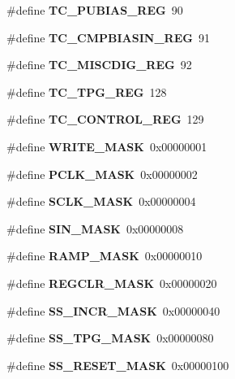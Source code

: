 \begin{DoxyCompactItemize}
\item 
\mbox{\label{_t_a_r_g_e_t_c___register_map_8h_a6f70b4595954ee34ef051f037d60ad72}} 
\#define {\bfseries T\+C\+\_\+\+P\+U\+B\+I\+A\+S\+\_\+\+R\+EG}~90
\item 
\mbox{\label{_t_a_r_g_e_t_c___register_map_8h_a981f56858ab0505bdfb5f44a8e383a08}} 
\#define {\bfseries T\+C\+\_\+\+C\+M\+P\+B\+I\+A\+S\+I\+N\+\_\+\+R\+EG}~91
\item 
\mbox{\label{_t_a_r_g_e_t_c___register_map_8h_af51134fc67d8fb0b51f0f740de167547}} 
\#define {\bfseries T\+C\+\_\+\+M\+I\+S\+C\+D\+I\+G\+\_\+\+R\+EG}~92
\item 
\mbox{\label{_t_a_r_g_e_t_c___register_map_8h_a0cbafe5115580fb4d1f0904c9922c984}} 
\#define {\bfseries T\+C\+\_\+\+T\+P\+G\+\_\+\+R\+EG}~128
\item 
\#define \textbf{ T\+C\+\_\+\+C\+O\+N\+T\+R\+O\+L\+\_\+\+R\+EG}~129
\item 
\mbox{\label{_t_a_r_g_e_t_c___register_map_8h_a63ac36b9e7738f8045152703b0d12610}} 
\#define {\bfseries W\+R\+I\+T\+E\+\_\+\+M\+A\+SK}~0x00000001
\item 
\mbox{\label{_t_a_r_g_e_t_c___register_map_8h_a481712bdbf0fd7feceff5f0f0f0270eb}} 
\#define {\bfseries P\+C\+L\+K\+\_\+\+M\+A\+SK}~0x00000002
\item 
\mbox{\label{_t_a_r_g_e_t_c___register_map_8h_ad5ce81d4dfee76c8602a216dec624697}} 
\#define {\bfseries S\+C\+L\+K\+\_\+\+M\+A\+SK}~0x00000004
\item 
\mbox{\label{_t_a_r_g_e_t_c___register_map_8h_a5f7ed5fc9832179ddb82998905555513}} 
\#define {\bfseries S\+I\+N\+\_\+\+M\+A\+SK}~0x00000008
\item 
\mbox{\label{_t_a_r_g_e_t_c___register_map_8h_aa03200be65ded4cc94da28c4ee5ff6de}} 
\#define {\bfseries R\+A\+M\+P\+\_\+\+M\+A\+SK}~0x00000010
\item 
\mbox{\label{_t_a_r_g_e_t_c___register_map_8h_a438c77f5783ee313533f65a4c152e4ca}} 
\#define {\bfseries R\+E\+G\+C\+L\+R\+\_\+\+M\+A\+SK}~0x00000020
\item 
\mbox{\label{_t_a_r_g_e_t_c___register_map_8h_a3944e2f58a2cb35326bad48e7ab7237f}} 
\#define {\bfseries S\+S\+\_\+\+I\+N\+C\+R\+\_\+\+M\+A\+SK}~0x00000040
\item 
\mbox{\label{_t_a_r_g_e_t_c___register_map_8h_a596e8b51a5e6b2586991e248dc07165c}} 
\#define {\bfseries S\+S\+\_\+\+T\+P\+G\+\_\+\+M\+A\+SK}~0x00000080
\item 
\mbox{\label{_t_a_r_g_e_t_c___register_map_8h_aa3c732231dc2c6788bcc4cf601a9e1f3}} 
\#define {\bfseries S\+S\+\_\+\+R\+E\+S\+E\+T\+\_\+\+M\+A\+SK}~0x00000100

\end{DoxyCompactItemize}
